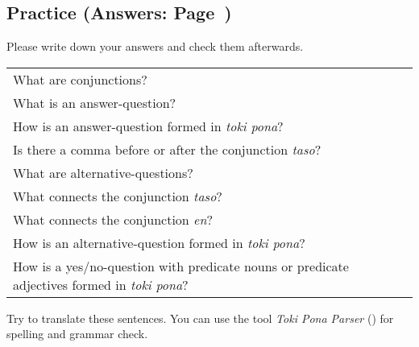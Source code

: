\subsection*{Practice (Answers: Page~\pageref{'conjunctions_temperature'})}
%
Please write down your answers and check them afterwards.

\begin{supertabular}{p{5,5cm}|ll}
    What are conjunctions?                                                                              &  & \\ %
    What is an answer-question?                                                                         &  & \\ %
    How is an answer-question formed in \textit{toki pona}?                                             &  & \\ %
    Is there a comma before or after the conjunction \textit{taso}?                                     &  & \\ %
    What are alternative-questions?                                                                     &  & \\ %
    What connects the conjunction \textit{taso}?                                                        &  & \\ %
    What connects the conjunction \textit{en}?                                                          &  & \\ %
    How is an alternative-question formed in \textit{toki pona}?                                        &  & \\ %
    How is a yes/no-question with predicate nouns or predicate adjectives formed in \textit{toki pona}? &  & \\ %
\end{supertabular}

Try to translate these sentences.
You can use the tool \textit{Toki Pona Parser} (\cite{www:rowa:02}) for spelling and grammar check.

